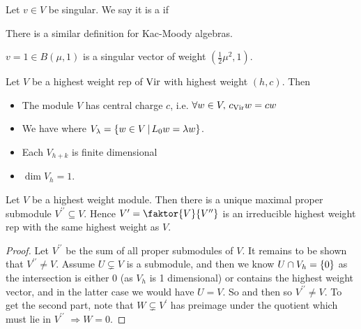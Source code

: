 \documentclass{article}
\begin{document}
\begin{definition}
Let $v \in V$ be singular. We say it is a  if 
\end{definition}

\begin{remark}
There is a similar definition for Kac-Moody algebras. 
\end{remark}

\begin{example}
$v = 1 \in B(\mu,1)$ is a singular vector of weight $(\frac{1}{2}\mu^2,1)$. 
\end{example}

\begin{prop}
Let $V$ be a highest weight rep of $\operatorname{Vir}$ with highest weight $(h,c)$. Then
\begin{itemize}
    \item The module $V$ has central charge $c$, i.e. $\forall w \in V, \, c_{\operatorname{Vir}}w = cw$
    \item We have 
    where $V_\lambda = \left\{ w \in V \, | \, L_0 w = \lambda w \right\}$.
    \item Each $V_{h+k} $ is finite dimensional 
    \item $\dim V_h = 1$. 
\end{itemize}
\end{prop}

\begin{prop}
Let $V$ be a highest weight module. Then there is a unique maximal proper submodule $V^{\prime\prime} \subseteq V$. Hence $V^\prime = \faktor{V}{V^{\prime\prime}}$ is an irreducible highest weight rep with the same highest weight as $V$.  
\end{prop}
\begin{proof}
Let $V^{\prime\prime}$ be the sum of all proper submodules of $V$. It remains to be shown that $V^{\prime\prime} \neq V$. Assume $U \subsetneq V$ is a submodule, and then we know $U \cap V_h = \left\{ 0 \right\}$ as the intersection is either $0$ (as $V_h$ is 1 dimensional) or contains the highest weight vector, and in the latter case we would have $U=V$. So 
and then 
so $V^{\prime\prime} \neq V$. To get the second part, note that $W \subsetneq V^{\prime}$ has preimage under the quotient which must lie in $V^{\prime\prime}$ $\Rightarrow W= 0$. 
\end{proof}
\end{document}
